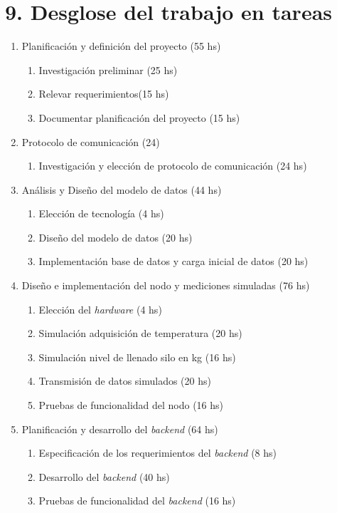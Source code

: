 \documentclass[
11pt, %
]{charter}
\begin{document}
\section{9. Desglose del trabajo en tareas}
\label{sec:wbs}

\begin{enumerate}
\item Planificación y definición del proyecto (55 hs)
	\begin{enumerate}
	\item Investigación preliminar (25 hs)
	\item Relevar requerimientos(15 hs)
	\item Documentar planificación del proyecto (15 hs)
	\end{enumerate}
\item Protocolo de comunicación (24)
	\begin{enumerate}
	\item Investigación y elección de protocolo de comunicación (24 hs)
	\end{enumerate}
\item Análisis y Diseño del modelo de datos (44 hs)
	\begin{enumerate}
	\item Elección de tecnología (4 hs)
	\item Diseño del modelo de datos (20 hs)
	\item Implementación base de datos y carga inicial de datos (20 hs)
	\end{enumerate}
\item Diseño e implementación del nodo y mediciones simuladas (76 hs)
	\begin{enumerate}
	\item Elección del \textit{hardware} (4 hs)
	\item Simulación adquisición de temperatura (20 hs)
	\item Simulación nivel de llenado silo en kg (16 hs)
	\item Transmisión de datos simulados (20 hs)
	\item Pruebas de funcionalidad del nodo (16 hs)
	\end{enumerate}	
\item Planificación y desarrollo del \textit{backend} (64 hs)
	\begin{enumerate}
	\item Especificación de los requerimientos del \textit{backend} (8 hs)
	\item Desarrollo del \textit{backend} (40 hs)
	\item Pruebas de funcionalidad del \textit{backend} (16 hs)

\end{enumerate}
\end{enumerate}
\end{document}
